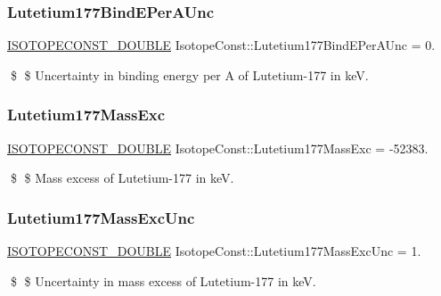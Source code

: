\subsubsection{\texorpdfstring{Lutetium177\+Bind\+E\+Per\+A\+Unc}{Lutetium177BindEPerAUnc}}
{\footnotesize\ttfamily \mbox{\hyperlink{group___isotope_const-_macros_ga8f45a7272ce02c0b4c65c44636ed719a}{I\+S\+O\+T\+O\+P\+E\+C\+O\+N\+S\+T\+\_\+\+D\+O\+U\+B\+LE}} Isotope\+Const\+::\+Lutetium177\+Bind\+E\+Per\+A\+Unc = 0.}

\$ \$ Uncertainty in binding energy per A of Lutetium-\/177 in keV. \mbox{\label{group___isotope_const-_lutetium-_lu177_ga2f0b56c9773112af14bdf171770bb0f0}} 
\subsubsection{\texorpdfstring{Lutetium177\+Mass\+Exc}{Lutetium177MassExc}}
{\footnotesize\ttfamily \mbox{\hyperlink{group___isotope_const-_macros_ga8f45a7272ce02c0b4c65c44636ed719a}{I\+S\+O\+T\+O\+P\+E\+C\+O\+N\+S\+T\+\_\+\+D\+O\+U\+B\+LE}} Isotope\+Const\+::\+Lutetium177\+Mass\+Exc = -\/52383.}

\$ \$ Mass excess of Lutetium-\/177 in keV. \mbox{\label{group___isotope_const-_lutetium-_lu177_ga18ececec13d5e8f736014676eb89f73c}} 
\subsubsection{\texorpdfstring{Lutetium177\+Mass\+Exc\+Unc}{Lutetium177MassExcUnc}}
{\footnotesize\ttfamily \mbox{\hyperlink{group___isotope_const-_macros_ga8f45a7272ce02c0b4c65c44636ed719a}{I\+S\+O\+T\+O\+P\+E\+C\+O\+N\+S\+T\+\_\+\+D\+O\+U\+B\+LE}} Isotope\+Const\+::\+Lutetium177\+Mass\+Exc\+Unc = 1.}

\$ \$ Uncertainty in mass excess of Lutetium-\/177 in keV. \mbox{\label{group___isotope_const-_lutetium-_lu177_gad6d464453c092cfb2d63554749f994ce}} 
